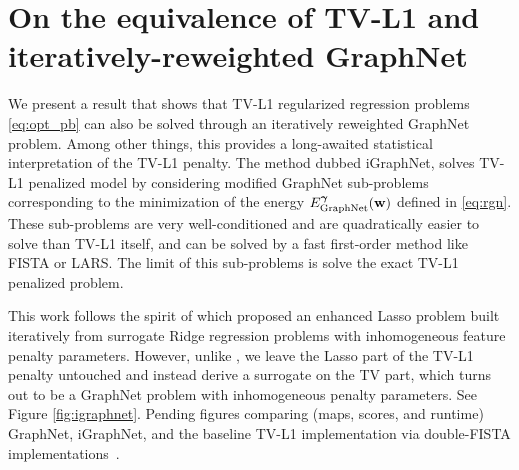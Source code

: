 \chapter{On the equivalence of TV-L1 and iteratively-reweighted
  GraphNet}\label{chap:igraphnet}

\minitoc

We present a result that shows that TV-L1 regularized regression problems \eqref{eq:opt_pb} can also be solved through an iteratively reweighted GraphNet problem. 
%
Among other things, this provides a long-awaited statistical interpretation of the TV-L1 penalty. The method dubbed iGraphNet, solves TV-L1 penalized model by considering modified GraphNet sub-problems corresponding to the minimization of the energy
$E_{\text{GraphNet}}^{\boldsymbol{\gamma}}(\mathbf{w})$ defined in \eqref{eq:rgn}. These sub-problems  are very well-conditioned and are quadratically easier to solve than TV-L1 itself, and can be solved by
a fast first-order method like FISTA or LARS. The limit of this sub-problems is solve the exact TV-L1 penalized problem.

This work follows the spirit of \citep{candes2007enhancing} which proposed an enhanced Lasso problem built iteratively from surrogate Ridge regression problems with inhomogeneous feature penalty parameters. However, unlike \citep{candes2007enhancing}, we leave the Lasso part of the TV-L1 penalty untouched and instead derive a surrogate on the TV part, which turns out to be a GraphNet problem with inhomogeneous penalty parameters.
See Figure \ref{fig:igraphnet}. Pending figures comparing (maps, scores, and
runtime) GraphNet, iGraphNet, and the baseline TV-L1 implementation via double-FISTA implementations~\citep{dohmatob2014benchmarking,varoquaux2015faasta}.


